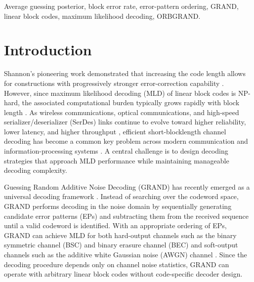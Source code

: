 \documentclass[letterpaper,draftclsnofoot,onecolumn]{IEEEtran}
\begin{document}
\begin{IEEEkeywords}
    Average guessing posterior, block error rate, error-pattern ordering, GRAND, linear block codes, maximum likelihood decoding, ORBGRAND.
\end{IEEEkeywords}


\section{Introduction}\label{Sec:introduction}

Shannon's pioneering work demonstrated that increasing the code length allows for constructions with progressively stronger error-correction capability \cite{shannon1948}. However, since maximum likelihood decoding (MLD) of linear block codes is NP-hard, the associated computational burden typically grows rapidly with block length \cite{berlekamp1978}. 
As wireless communications, optical communications, and high-speed serializer/deserializer (SerDes) links continue to evolve toward higher reliability, lower latency, and higher throughput \cite{you2021towards,winzer2018fiber,mickevicius2021serdes}, efficient short-blocklength channel decoding has become a common key problem across modern communication and information-processing systems \cite{shirvanimoghaddam2018short, yue2023efficient}. A central challenge is to design decoding strategies that approach MLD performance while maintaining manageable decoding complexity.

Guessing Random Additive Noise Decoding (GRAND) has recently emerged as a universal decoding framework \cite{duffy2019GRAND}. Instead of searching over the codeword space, GRAND performs decoding in the noise domain by sequentially generating candidate error patterns (EPs) and subtracting them from the received sequence until a valid codeword is identified. With an appropriate ordering of EPs, GRAND can achieve MLD for both hard-output channels such as the binary symmetric channel (BSC) and binary erasure channel (BEC) \cite{duffy2018guessing, duffy2019GRAND} and soft-output channels such as the additive white Gaussian noise (AWGN) channel \cite{solomon2020SGRAND}. Since the decoding procedure depends only on channel noise statistics, GRAND can operate with arbitrary linear block codes without code-specific decoder design.



\end{document}
